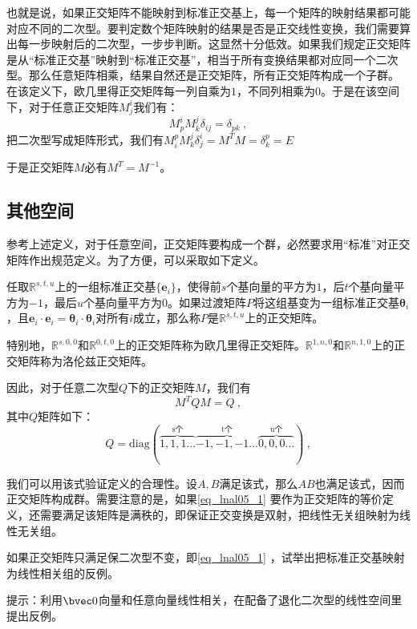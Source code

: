 也就是说，如果正交矩阵不能映射到标准正交基上，每一个矩阵的映射结果都可能对应不同的二次型。要判定数个矩阵映射的结果是否是正交线性变换，我们需要算出每一步映射后的二次型，一步步判断。这显然十分低效。如果我们规定正交矩阵是从“标准正交基”映射到“标准正交基”，相当于所有变换结果都对应同一个二次型。那么任意矩阵相乘，结果自然还是正交矩阵，所有正交矩阵构成一个子群。
在该定义下，欧几里得正交矩阵每一列自乘为$1$，不同列相乘为$0$。于是在该空间下，对于任意正交矩阵$M^i_j$我们有：
\begin{equation}
M^i_pM^j_k\delta_{ij}=\delta_{pk}~,
\end{equation}
把二次型写成矩阵形式，我们有$M^p_iM^j_k\delta^i_j=M^T M=\delta^p_k=E$

于是正交矩阵$M$必有$M^T=M^{-1}$。
\subsection{其他空间}
参考上述定义，对于任意空间，正交矩阵要构成一个群，必然要求用“标准”对正交矩阵作出规范定义。为了方便，可以采取如下定义。
\begin{definition}{}\label{def_lnal05_1}
任取$\mathbb R^{s,t,u}$上的一组标准正交基$\{\boldsymbol{e}_i\}$，使得前$s$个基向量的平方为$1$，后$t$个基向量平方为$-1$，最后$u$个基向量平方为$0$。如果过渡矩阵$P$将这组基变为一组标准正交基${\boldsymbol{\theta}_i}$，且$\boldsymbol{e}_i\cdot \boldsymbol{e}_i=\boldsymbol{\theta}_i\cdot\boldsymbol{\theta}_i$对所有$i$成立，那么称$P$是$\mathbb R^{s,t,u}$上的正交矩阵。

特别地，$\mathbb R^{s,0,0}$和$\mathbb R^{0,t,0}$上的正交矩阵称为欧几里得正交矩阵。$\mathbb R^{1,n,0}$和$\mathbb R^{n,1,0}$上的正交矩阵称为洛伦兹正交矩阵。
\end{definition}
因此，对于任意二次型$Q$下的正交矩阵$M$，我们有
\begin{equation}
M^TQM=Q~,
\end{equation}
其中$Q$矩阵如下：
\begin{equation}\label{eq_lnal05_1}
Q=\mathrm{diag}(\overbrace{1,1,1...}^{\text{s个}}\overbrace{-1,-1,-1...}^{\text{t个}}\overbrace{0,0,0...}^{\text{u个}})~,
\end{equation}

我们可以用该式验证定义的合理性。设$A,B$满足该式，那么$AB$也满足该式，因而正交矩阵构成群。需要注意的是，如果\autoref{eq_lnal05_1} 要作为正交矩阵的等价定义，还需要满足该矩阵是满秩的，即保证正交变换是双射，把线性无关组映射为线性无关组。
\begin{exercise}{}
如果正交矩阵只满足保二次型不变，即\autoref{eq_lnal05_1} ，试举出把标准正交基映射为线性相关组的反例。

提示：利用$\bvec 0$向量和任意向量线性相关，在配备了退化二次型的线性空间里提出反例。
\end{exercise}